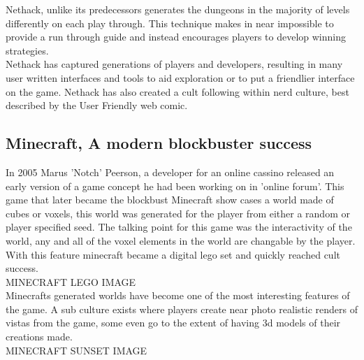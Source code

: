 Nethack, unlike its predecessors generates the dungeons in the majority of levels
differently on each play through. This technique makes in near impossible to 
provide a run through guide and instead encourages players to develop winning
strategies.\\

Nethack has captured generations of players and developers, resulting in many 
user written interfaces and tools to aid exploration or to put a friendlier 
interface on the game. Nethack has also created a cult following within nerd 
culture, best described by the User Friendly web comic.\\

\subsection*{Minecraft, A modern blockbuster success}
In 2005 Marus 'Notch' Peerson, a developer for an online cassino released an
early version of a game concept he had been working on in 'online forum'. This
game that later became the blockbust Minecraft show cases a world made of cubes 
or voxels, this world was generated for the player from either a random or 
player specified seed. The talking point for this game was the interactivity of
the world, any and all of the voxel elements in the world are changable by the
player. With this feature minecraft became a digital lego set and quickly 
reached cult success.\\

MINECRAFT LEGO IMAGE \\

Minecrafts generated worlds have become one of the most interesting features of 
the game. A sub culture exists where players create near photo realistic renders
of vistas from the game, some even go to the extent of having 3d models of their
creations made. \\

MINECRAFT SUNSET IMAGE\\
